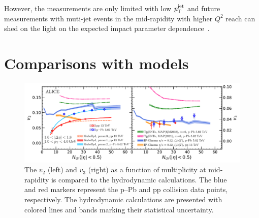 However, the measurements are only limited with low $\it{p}^{\rm{jet}}_{\rm{T}}$ and future measurements with muti-jet events in the mid-rapidity with higher $Q^2$ reach can shed on the light on the expected impact parameter dependence~\cite{Sjostrand:1986ep,Frankfurt:2003td,Frankfurt:2010ea}.


\section{Comparisons with models}
\label{sec:theory}

\begin{figure}[h!]
	\centering
	\includegraphics[width=1.0\textwidth]{figures/Fig6_v2Mult_allSystems_Hydro.pdf} 
	\caption{The $v_2$ (left) and $v_3$ (right) as a function of multiplicity at mid-rapidity is compared to the hydrodynamic calculations. The blue and red markers represent the p--Pb and pp collision data points, respectively. The hydrodynamic calculations are presented with colored lines and bands marking their statistical uncertainty.} 
	\label{fig:vnmult_model}
\end{figure}

